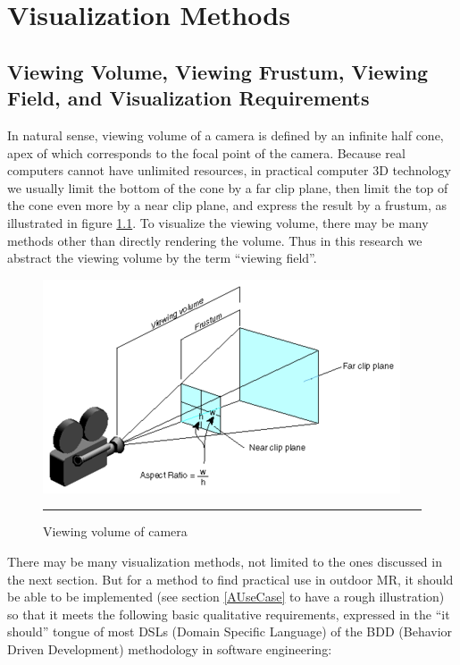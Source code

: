 \chapter{Visualization Methods}
\label{Chapter3}


\section{Viewing Volume, Viewing Frustum, Viewing Field, and Visualization Requirements}
\label{VisualizationRequirements}

In natural sense, viewing volume of a camera is defined by an infinite half cone, apex of which corresponds to the focal point of the camera. Because real computers cannot have unlimited resources, in practical computer 3D technology we usually limit the bottom of the cone by a far clip plane, then limit the top of the cone even more by a near clip plane, and express the result by a frustum, as illustrated in figure \ref{fig:ViewingVolume}. To visualize the viewing volume, there may be many methods other than directly rendering the volume. Thus in this research we abstract the viewing volume by the term ``viewing field''.

\begin{figure}[htbp]
	\centering
	\includegraphics{./Primitives/viewing_volume.png}
	\rule{35em}{0.5pt}
	\caption[Viewing volume of camera]{Viewing volume of camera}
	\label{fig:ViewingVolume}
\end{figure}

There may be many visualization methods, not limited to the ones discussed in the next section. But for a method to find practical use in outdoor MR, it should be able to be implemented (see section \ref{AUseCase} to have a rough illustration) so that it meets the following basic qualitative requirements, expressed in the ``it should'' tongue of most DSLs (Domain Specific Language) of the BDD (Behavior Driven Development) methodology in software engineering:

